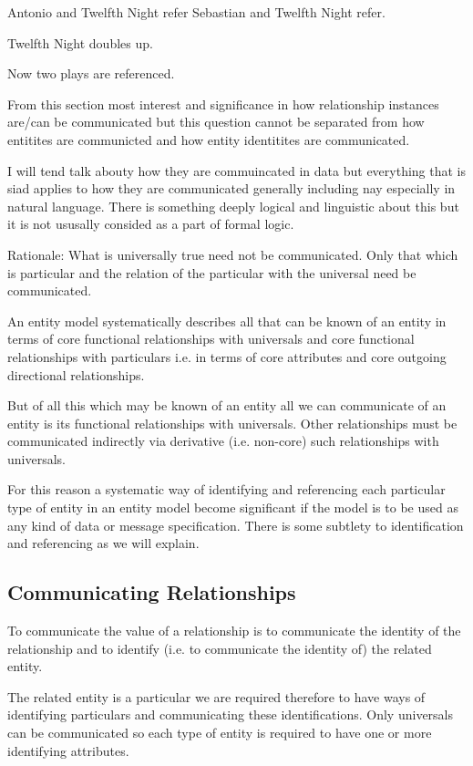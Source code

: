Antonio and Twelfth Night refer
Sebastian and Twelfth Night refer.

Twelfth Night doubles up.

Now two plays are referenced.

\mynote From this section most interest and significance  in how relationship instances are/can be communicated but this question cannot be separated from how entitites are communicted and how entity identitites are communicated.

\mynote I will tend talk abouty how they are commuincated in data but everything that is siad applies to how they are communicated generally including nay especially in natural language. There is something deeply logical and linguistic about this but it is not ususally consided as a part of formal logic.

\mynote Rationale: What is universally true need not be communicated. Only that which is particular and the relation of the particular with the universal need be communicated. 

\mynote An entity model systematically describes all that can be known of an entity
in terms of core functional relationships with universals and core functional relationships with particulars i.e. in terms of core attributes and core outgoing directional relationships.

\mynote But of all this which  may be known of an entity all we can communicate of an entity is its functional relationships with universals. Other relationships must be communicated indirectly via derivative (i.e. non-core) such relationships with universals. 

\mynote For this reason a systematic way of identifying and referencing each particular type  of entity in an entity model become significant if the model is to be used as any kind of data or message specification. There is some subtlety to identification and referencing as we will explain.

\subsection*{Communicating Relationships}
\mynote To communicate the value of a relationship is to communicate the identity of the relationship and to identify (i.e. to communicate the identity of) the related entity. 

\mynote The related entity is a particular we are required therefore to have ways of identifying particulars and communicating these identifications.  
Only universals can be communicated so each type of entity is required 
to have one or more identifying attributes. 

